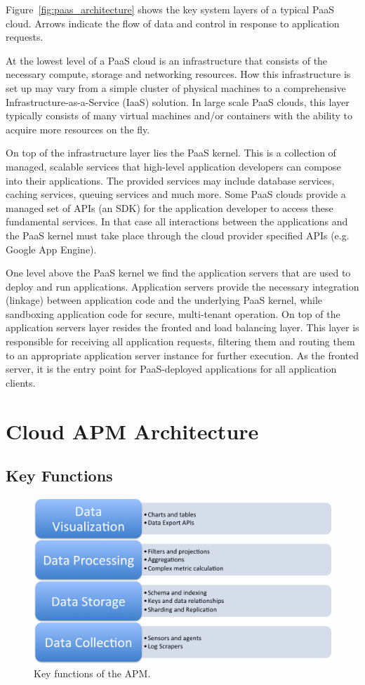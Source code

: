 \documentclass[11pt]{article}
\begin{document}
Figure~\ref{fig:paas_architecture} shows the key system layers of a typical PaaS cloud. Arrows indicate
the flow of data and control in response to application requests.

At the lowest level of a PaaS cloud is an infrastructure that consists of the necessary compute, storage
and networking resources. How this infrastructure is set up may vary from a simple cluster of physical 
machines to a comprehensive Infrastructure-as-a-Service (IaaS) solution. In large scale PaaS clouds,
this layer typically consists of many virtual machines and/or containers with the ability to acquire more
resources on the fly.

On top of the infrastructure layer lies the PaaS kernel. This is a collection of managed, scalable
services that high-level application developers can compose into their applications. The provided services
may include database services, caching services, queuing services and much more. Some PaaS clouds
provide a managed set of APIs (an SDK) for the application developer to access these fundamental services. 
In that case all interactions between the applications and the PaaS kernel must take place through
the cloud provider specified APIs (e.g. Google App Engine). 

One level above the PaaS kernel we find the application servers that are used to deploy and run
applications. Application servers provide the necessary integration (linkage) between application code and the
underlying PaaS kernel, while sandboxing application code for secure, multi-tenant operation. On top
of the application servers layer resides the fronted and load balancing layer. This layer is responsible
for receiving all application requests, filtering them and routing them to an appropriate application
server instance for further execution. As the fronted server, it is the entry point for PaaS-deployed
applications for all application clients.

\section{Cloud APM Architecture}
\subsection{Key Functions}
\begin{figure}
\centering
\includegraphics[scale=0.5]{apm_functions}
\caption{Key functions of the APM.}
\label{fig:apm_functions}
\end{figure}
\end{document}
